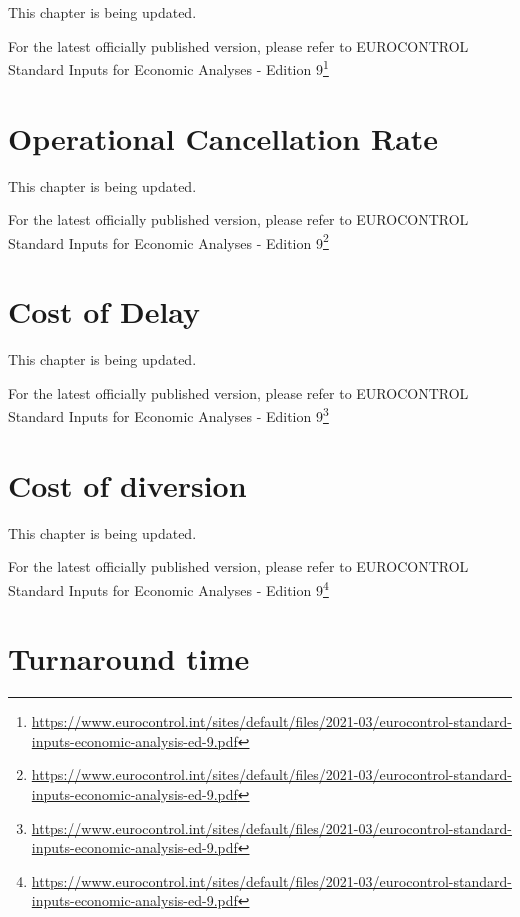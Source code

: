 \documentclass[
  11pt,
  a4paper,
]{book}
\DeclareRobustCommand{\href}[2]{#2\footnote{\url{#1}}}
\begin{document}
This chapter is being updated.

For the latest officially published version, please refer to
\href{https://www.eurocontrol.int/sites/default/files/2021-03/eurocontrol-standard-inputs-economic-analysis-ed-9.pdf}{EUROCONTROL
Standard Inputs for Economic Analyses - Edition 9}

\hypertarget{sec-operational-cancellation-rate}{%
\chapter{Operational Cancellation
Rate}\label{sec-operational-cancellation-rate}}

This chapter is being updated.

For the latest officially published version, please refer to
\href{https://www.eurocontrol.int/sites/default/files/2021-03/eurocontrol-standard-inputs-economic-analysis-ed-9.pdf}{EUROCONTROL
Standard Inputs for Economic Analyses - Edition 9}

\hypertarget{sec-cost-of-delay}{%
\chapter{Cost of Delay}\label{sec-cost-of-delay}}

This chapter is being updated.

For the latest officially published version, please refer to
\href{https://www.eurocontrol.int/sites/default/files/2021-03/eurocontrol-standard-inputs-economic-analysis-ed-9.pdf}{EUROCONTROL
Standard Inputs for Economic Analyses - Edition 9}

\hypertarget{sec-cost-of-diversions}{%
\chapter{Cost of diversion}\label{sec-cost-of-diversions}}

This chapter is being updated.

For the latest officially published version, please refer to
\href{https://www.eurocontrol.int/sites/default/files/2021-03/eurocontrol-standard-inputs-economic-analysis-ed-9.pdf}{EUROCONTROL
Standard Inputs for Economic Analyses - Edition 9}

\hypertarget{sec-turnaround-time}{%
\chapter{Turnaround time}\label{sec-turnaround-time}}
\end{document}
